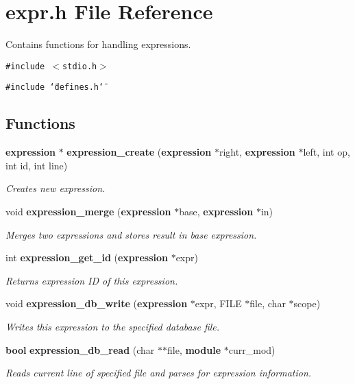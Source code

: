 \section{expr.h File Reference}
\label{expr_8h}
Contains functions for handling expressions. 


{\tt \#include $<$stdio.h$>$}\par
{\tt \#include \char`\"{}defines.h\char`\"{}}\par
\subsection*{Functions}
\begin{CompactItemize}
\item 
{\bf expression} $\ast$ {\bf expression\_\-create} ({\bf expression} $\ast$right, {\bf expression} $\ast$left, int op, int id, int line)
\begin{CompactList}\small\item\em Creates new expression.\item\end{CompactList}\item 
void {\bf expression\_\-merge} ({\bf expression} $\ast$base, {\bf expression} $\ast$in)
\begin{CompactList}\small\item\em Merges two expressions and stores result in base expression.\item\end{CompactList}\item 
int {\bf expression\_\-get\_\-id} ({\bf expression} $\ast$expr)
\begin{CompactList}\small\item\em Returns expression ID of this expression.\item\end{CompactList}\item 
void {\bf expression\_\-db\_\-write} ({\bf expression} $\ast$expr, FILE $\ast$file, char $\ast$scope)
\begin{CompactList}\small\item\em Writes this expression to the specified database file.\item\end{CompactList}\item 
{\bf bool} {\bf expression\_\-db\_\-read} (char $\ast$$\ast$file, {\bf module} $\ast$curr\_\-mod)
\begin{CompactList}\small\item\em Reads current line of specified file and parses for expression information.\item\end{CompactList}\item 
$$
\end{CompactItemize}

